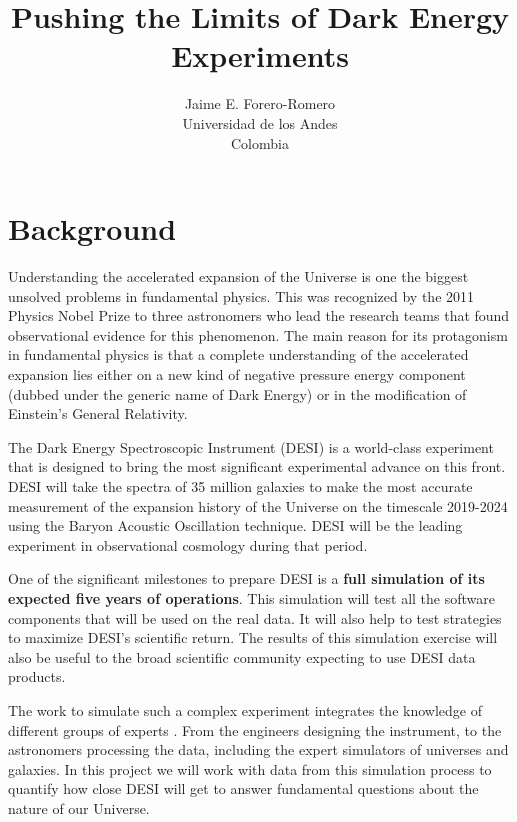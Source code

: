 \documentclass[12pt]{article}
\title{Pushing the Limits of Dark Energy Experiments}
\author{Jaime E. Forero-Romero\\Universidad de los Andes\\Colombia}
\begin{document}
\maketitle
\section*{Background}

Understanding the accelerated expansion of the Universe is one the
biggest unsolved problems in fundamental physics.  
This was recognized by the 2011 Physics Nobel Prize to three
astronomers who lead the research teams that found observational evidence for
this phenomenon.  
The main reason for its protagonism in fundamental physics is that a
complete understanding of the accelerated expansion lies either on a
new kind of negative pressure energy component (dubbed under the
generic name of Dark Energy) or in the modification of Einstein's
General Relativity.   

The Dark Energy Spectroscopic Instrument (DESI) is a world-class
experiment that is designed to bring the most significant experimental
advance on this front. 
DESI will take the spectra of 35 million galaxies to make the most
accurate measurement of the expansion history of the Universe on the
timescale 2019-2024 using the Baryon Acoustic Oscillation technique.  
DESI will be the leading experiment in observational cosmology during
that period.  

One of the significant milestones to prepare DESI is a {\bf full simulation
of its expected five years of operations}. 
This simulation will test all the software components that will be used on
the real data. It will also help to test strategies to  maximize
DESI's scientific return.   
The results of this simulation exercise will also be useful to the
broad scientific community expecting to use DESI data products. 
 
The work to simulate such a complex experiment integrates the knowledge of
different groups of experts \cite{2016A&C....15....1N}. 
From the engineers designing   the instrument, to the astronomers
processing the data, including the expert simulators of universes and
galaxies. 
In this project we will work with data from this simulation process to
quantify how close DESI will get to answer fundamental questions about
the nature of our Universe.  
\end{document}
